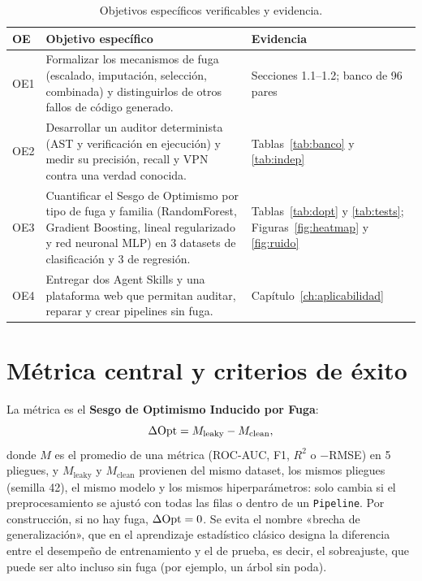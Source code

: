 \begin{table}[H]
\centering
\caption{Objetivos específicos verificables y evidencia.}
\label{tab:oe}
\begingroup\footnotesize\singlespacing
\begin{tabular}{@{}l p{9.4cm} p{4.4cm}@{}}
\toprule
OE & Objetivo específico & Evidencia \\
\midrule
OE1 & Formalizar los mecanismos de fuga (escalado, imputación, selección, combinada) y distinguirlos de otros fallos de código generado. & Secciones 1.1--1.2; banco de 96 pares \\
OE2 & Desarrollar un auditor determinista (AST y verificación en ejecución) y medir su precisión, recall y VPN contra una verdad conocida. & Tablas~\ref{tab:banco} y \ref{tab:indep} \\
OE3 & Cuantificar el Sesgo de Optimismo \DOpt{} por tipo de fuga y familia (RandomForest, Gradient Boosting, lineal regularizado y red neuronal MLP) en 3 datasets de clasificación y 3 de regresión. & Tablas~\ref{tab:dopt} y \ref{tab:tests}; Figuras~\ref{fig:heatmap} y \ref{fig:ruido} \\
OE4 & Entregar dos Agent Skills y una plataforma web que permitan auditar, reparar y crear pipelines sin fuga. & Capítulo~\ref{ch:aplicabilidad} \\
\bottomrule
\end{tabular}
\endgroup
\end{table}

\section{Métrica central y criterios de éxito}

La métrica es el \textbf{Sesgo de Optimismo Inducido por Fuga}:
\begin{equation}
\Delta\mathrm{Opt} = M_{\mathrm{leaky}} - M_{\mathrm{clean}},
\end{equation}
donde $M$ es el promedio de una métrica (ROC-AUC, F1, $R^2$ o $-$RMSE) en 5 pliegues, y $M_{\mathrm{leaky}}$ y $M_{\mathrm{clean}}$ provienen del mismo dataset, los mismos pliegues (semilla 42), el mismo modelo y los mismos hiperparámetros: solo cambia si el preprocesamiento se ajustó con todas las filas o dentro de un \texttt{Pipeline}. Por construcción, si no hay fuga, $\Delta\mathrm{Opt}=0$. Se evita el nombre «brecha de generalización», que en el aprendizaje estadístico clásico designa la diferencia entre el desempeño de entrenamiento y el de prueba, es decir, el sobreajuste, que puede ser alto incluso sin fuga (por ejemplo, un árbol sin poda).

